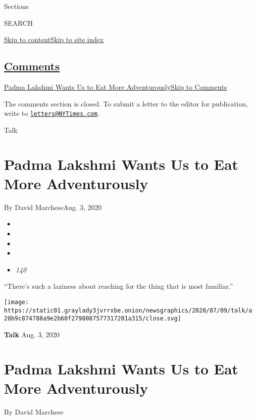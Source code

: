 Sections

SEARCH

\protect\hyperlink{site-content}{Skip to
content}\protect\hyperlink{site-index}{Skip to site index}

\hypertarget{comments}{%
\subsection{\texorpdfstring{\protect\hyperlink{commentsContainer}{Comments}}{Comments}}\label{comments}}

\href{}{Padma Lakshmi Wants Us to Eat More Adventurously}\href{}{Skip to
Comments}

The comments section is closed. To submit a letter to the editor for
publication, write to
\href{mailto:letters@NYTimes.com}{\nolinkurl{letters@NYTimes.com}}.

Talk

\hypertarget{padma-lakshmi-wants-us-to-eat-more-adventurously}{%
\section{Padma Lakshmi Wants Us to Eat More
Adventurously}\label{padma-lakshmi-wants-us-to-eat-more-adventurously}}

By David MarcheseAug. 3, 2020

\begin{itemize}
\item
\item
\item
\item
\item
  \emph{140}
\end{itemize}

``There's such a laziness about reaching for the thing that is most
familiar.''

\texttt{[image: https://static01.graylady3jvrrxbe.onion/newsgraphics/2020/07/09/talk/a28b9c874788a9e2b60f2798087577317201a315/close.svg]}

\textbf{Talk} Aug. 3, 2020

\hypertarget{padma-lakshmi-wants-us-to-eat-more-adventurously-1}{%
\section{Padma Lakshmi Wants Us to Eat More
Adventurously}\label{padma-lakshmi-wants-us-to-eat-more-adventurously-1}}

By David Marchese

